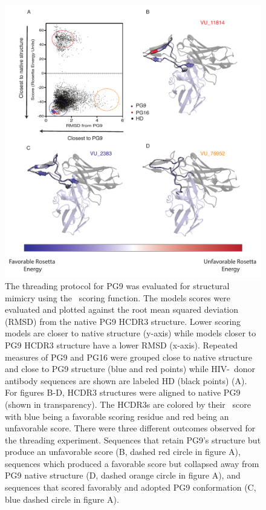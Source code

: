 \begin{figure}
   \centering
   \includegraphics[width=.9\linewidth]{images/chapter3/figure3_9.pdf} %
   \caption[Threading PG9 Produces Three Structural Outcomes]{The threading protocol for PG9 was evaluated for structural mimicry using the \rosetta~scoring function. The models scores were evaluated and plotted against the root mean squared deviation (RMSD) from the native PG9 HCDR3 structure. Lower scoring models are closer to native structure (y-axis) while models closer to PG9 HCDR3 structure have a lower RMSD (x-axis). Repeated measures of PG9 and PG16 were grouped close to native structure and close to PG9 structure (blue and red points) while HIV-\naive~donor antibody sequences are shown are labeled HD (black points) (A). For figures B-D, HCDR3 structures were aligned to native PG9 (shown in transparency). The HCDR3s are colored by their \rosetta~score with blue being a favorable scoring residue and red being an unfavorable score. There were three different outcomes observed for the threading experiment. Sequences that retain PG9's structure but produce an unfavorable score (B, dashed red circle in figure A), sequences which produced a favorable score but collapsed away from PG9 native structure (D, dashed orange circle in figure A), and sequences that scored favorably and adopted PG9 conformation (C, blue dashed circle in figure A).}
   \label{fig:figure3_9}
\end{figure}


